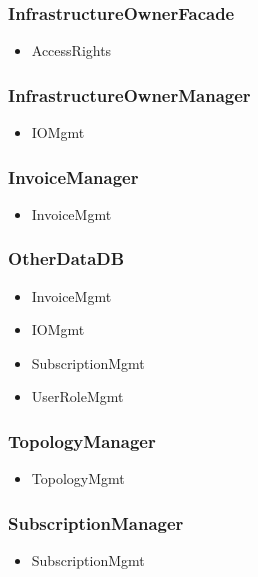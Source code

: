     \subsubsection{InfrastructureOwnerFacade}
        \begin{itemize}
            \item AccessRights
        \end{itemize}

    \subsubsection{InfrastructureOwnerManager}
        \begin{itemize}
            \item IOMgmt
        \end{itemize}

    \subsubsection{InvoiceManager}
        \begin{itemize}
            \item InvoiceMgmt
        \end{itemize}

    \subsubsection{OtherDataDB}
        \begin{itemize}
            \item InvoiceMgmt
            \item IOMgmt
            \item SubscriptionMgmt
            \item UserRoleMgmt
        \end{itemize}

    \subsubsection{TopologyManager}
        \begin{itemize}
            \item TopologyMgmt
        \end{itemize}

    \subsubsection{SubscriptionManager}
        \begin{itemize}
            \item SubscriptionMgmt
        \end{itemize}

